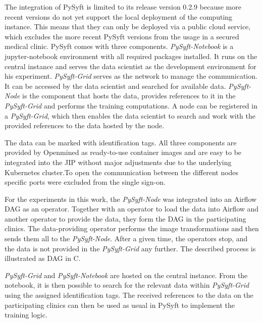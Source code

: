 The integration of PySyft is limited to its release version 0.2.9 because more recent versions do not yet support the local deployment of the computing instance.
This means that they can only be deployed via a public cloud service, which excludes the more recent PySyft versions from the usage in a secured medical clinic.
PySyft comes with three components.
\textit{PySyft-Notebook} is a jupyter-notebook environment with all required packages installed. It runs on the central instance and serves the data scientist as the development environment for his experiment.
\textit{PySyft-Grid} serves as the network to manage the communication. It can be accessed by the data scientist and searched for available data.
\textit{PySyft-Node} is the component that hosts the data, provides references to it in the \textit{PySyft-Grid} and performs the training computations. A node can be registered in a \textit{PySyft-Grid}, which then enables the data scientist to search and work with the provided references to the data hosted by the node.

The data can be marked with identification tags. All three components are provided by Openmined as ready-to-use container images and are easy to be integrated into the JIP without major adjustments due to the underlying Kubernetes cluster.To open the communication between the different nodes specific ports were excluded from the single sign-on.

For the experiments in this work, the \textit{PySyft-Node} was integrated into an Airflow DAG as an operator. Together with an operator to load the data into Airflow and another operator to provide the data, they form the DAG in the participating clinics. The data-providing operator performs the image transformations and then sends them all to the \textit{PySyft-Node}. After a given time, the operators stop, and the data is not provided in the \textit{PySyft-Grid} any further. The described process is illustrated as DAG in  C.

\textit{PySyft-Grid} and \textit{PySyft-Notebook} are hosted on the central instance.
From the notebook, it is then possible to search for the relevant data within \textit{PySyft-Grid} using the assigned identification tags. The received references to the data on the participating clinics can then be used as usual in PySyft to implement the training logic.

